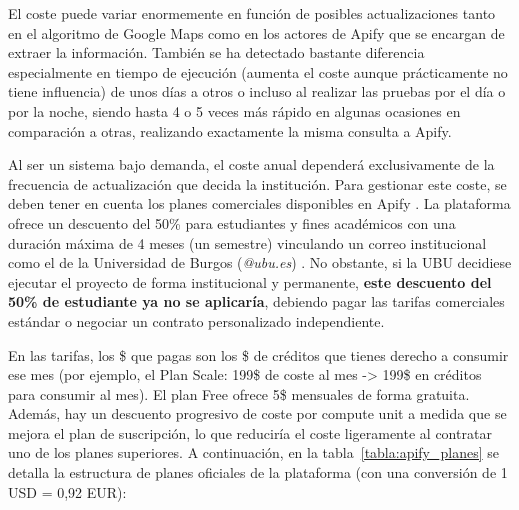 El coste puede variar enormemente en función de posibles actualizaciones tanto en el algoritmo de Google Maps como en los actores de Apify que se encargan de extraer la información. También se ha detectado bastante diferencia especialmente en tiempo de ejecución (aumenta el coste aunque prácticamente no tiene influencia) de unos días a otros o incluso al realizar las pruebas por el día o por la noche, siendo hasta 4 o 5 veces más rápido en algunas ocasiones en comparación a otras, realizando exactamente la misma consulta a Apify.

Al ser un sistema bajo demanda, el coste anual dependerá exclusivamente de la frecuencia de actualización que decida la institución. Para gestionar este coste, se deben tener en cuenta los planes comerciales disponibles en Apify \cite{apify_pricing}. La plataforma ofrece un descuento del 50\% para estudiantes y fines académicos con una duración máxima de 4 meses (un semestre) vinculando un correo institucional como el de la Universidad de Burgos (\textit{@ubu.es}) \cite{apify_universities}. No obstante, si la UBU decidiese ejecutar el proyecto de forma institucional y permanente, \textbf{este descuento del 50\% de estudiante ya no se aplicaría}, debiendo pagar las tarifas comerciales estándar o negociar un contrato personalizado independiente. 

En las tarifas, los \$ que pagas son los \$ de créditos que tienes derecho a consumir ese mes (por ejemplo, el Plan Scale: 199\$ de coste al mes -> 199\$ en créditos para consumir al mes). El plan Free ofrece 5\$ mensuales de forma gratuita. Además, hay un descuento progresivo de coste por compute unit a medida que se mejora el plan de suscripción, lo que reduciría el coste ligeramente al contratar uno de los planes superiores. A continuación, en la tabla~\ref{tabla:apify_planes} se detalla la estructura de planes oficiales de la plataforma (con una conversión de 1 USD = 0,92 EUR):

{%
\setlength{\tabcolsep}{4pt}
}%

